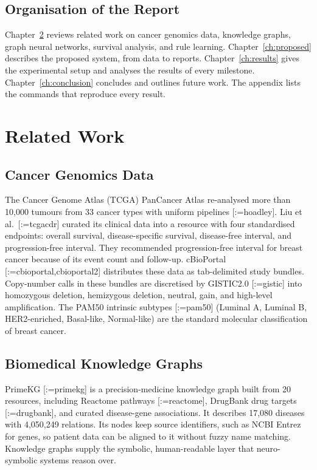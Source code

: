 \documentclass{mnnit}
\makeatletter
\newcommand{\rc}[1]{[\def\rc@sep{}\@for\rc@key:=#1\do{\rc@sep\ref{ref:\rc@key}\def\rc@sep{, }}]}
\makeatother
\begin{document}
\section{Organisation of the Report}
Chapter~\ref{ch:related} reviews related work on cancer genomics data, knowledge graphs, graph neural networks,
survival analysis, and rule learning. Chapter~\ref{ch:proposed} describes the proposed system, from data to
reports. Chapter~\ref{ch:results} gives the experimental setup and analyses the results of every milestone.
Chapter~\ref{ch:conclusion} concludes and outlines future work. The appendix lists the commands that reproduce
every result.

\chapter{Related Work}\label{ch:related}

\section{Cancer Genomics Data}
The Cancer Genome Atlas (TCGA) PanCancer Atlas re-analysed more than 10,000 tumours from 33 cancer types with
uniform pipelines \rc{hoadley}. Liu et al.\ \rc{tcgacdr} curated its clinical data into a resource with four
standardised endpoints: overall survival, disease-specific survival, disease-free interval, and
progression-free interval. They recommended progression-free interval for breast cancer because of its event
count and follow-up. cBioPortal \rc{cbioportal,cbioportal2} distributes these data as tab-delimited study
bundles. Copy-number calls in these bundles are discretised by GISTIC2.0 \rc{gistic} into homozygous deletion,
hemizygous deletion, neutral, gain, and high-level amplification. The PAM50 intrinsic subtypes \rc{pam50}
(Luminal A, Luminal B, HER2-enriched, Basal-like, Normal-like) are the standard molecular classification of breast
cancer.

\section{Biomedical Knowledge Graphs}
PrimeKG \rc{primekg} is a precision-medicine knowledge graph built from 20 resources, including Reactome pathways
\rc{reactome}, DrugBank drug targets \rc{drugbank}, and curated disease-gene associations. It describes 17,080
diseases with 4,050,249 relations. Its nodes keep source identifiers, such as NCBI Entrez for genes, so patient data
can be aligned to it without fuzzy name matching. Knowledge graphs supply the symbolic, human-readable layer that
neuro-symbolic systems reason over.
\end{document}
